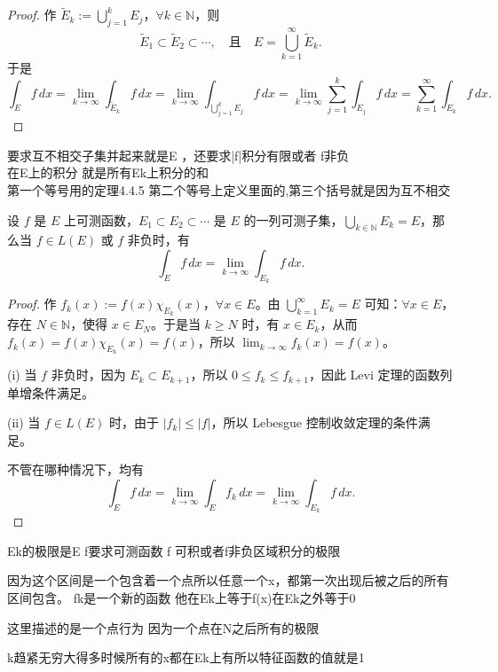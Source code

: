 \documentclass[lang=cn,10pt]{elegantbook}
\begin{document}
\begin{proof}
作 $\tilde{E}_k := \bigcup_{j=1}^k E_j$，$\forall k \in \mathbb{N}$，则
\[
\tilde{E}_1 \subset \tilde{E}_2 \subset \cdots, \quad \text{且} \quad E = \bigcup_{k=1}^\infty \tilde{E}_k.
\]
于是
\[
\int_E f\,dx 
= \lim_{k \to \infty} \int_{\tilde{E}_k} f\,dx
= \lim_{k \to \infty} \int_{\bigcup_{j=1}^k E_j} f\,dx
= \lim_{k \to \infty} \sum_{j=1}^k \int_{E_j} f\,dx
= \sum_{k=1}^\infty \int_{E_k} f\,dx.
\]
\end{proof}
要求互不相交子集并起来就是E  ，还要求|f|积分有限或者 f非负\\

在E上的积分 就是所有Ek上积分的和 \\

第一个等号用的定理4.4.5 第二个等号上定义里面的,第三个括号就是因为互不相交\\
\begin{theorem}[积分区域极限定理]
设 $f$ 是 $E$ 上可测函数，$E_1 \subset E_2 \subset \cdots$ 是 $E$ 的一列可测子集，$\bigcup_{k \in \mathbb{N}} E_k = E$，那么当 $f \in L(E)$ 或 $f$ 非负时，有
\[
\int_E f\, dx = \lim_{k \to \infty} \int_{E_k} f\, dx.
\]
\end{theorem}

\begin{proof}
作 $f_k(x) := f(x) \chi_{E_k}(x)$，$\forall x \in E$。由 $\bigcup_{k=1}^\infty E_k = E$ 可知：$\forall x \in E$，存在 $N \in \mathbb{N}$，使得 $x \in E_N$。于是当 $k \ge N$ 时，有 $x \in E_k$，从而 $f_k(x) = f(x) \chi_{E_k}(x) = f(x)$，所以 $\lim_{k \to \infty} f_k(x) = f(x)$。

\noindent (i) 当 $f$ 非负时，因为 $E_k \subset E_{k+1}$，所以 $0 \le f_k \le f_{k+1}$，因此 Levi 定理的函数列单增条件满足。

\noindent (ii) 当 $f \in L(E)$ 时，由于 $|f_k| \le |f|$，所以 Lebesgue 控制收敛定理的条件满足。

不管在哪种情况下，均有
\[
\int_E f\, dx = \lim_{k \to \infty} \int_E f_k\, dx = \lim_{k \to \infty} \int_{E_k} f\, dx.
\]
\end{proof}
Ek的极限是E f要求可测函数 f 可积或者f非负区域积分的极限 

因为这个区间是一个包含着一个点所以任意一个x，都第一次出现后被之后的所有区间包含。
fk是一个新的函数 他在Ek上等于f(x)在Ek之外等于0

这里描述的是一个点行为 因为一个点在N之后所有的极限

k趋紧无穷大得多时候所有的x都在Ek上有所以特征函数的值就是1
\end{document}
